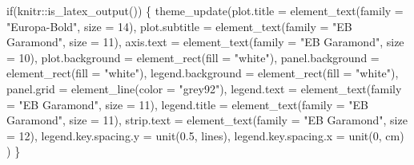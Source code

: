 \documentclass[
  10pt,
  letterpaper,
  DIV=11,
  numbers=noendperiod,
  twoside]{scrartcl}
\newenvironment{Shaded}{\begin{snugshade}}{\end{snugshade}}
\newcommand{\AttributeTok}[1]{\textcolor[rgb]{0.40,0.45,0.13}{#1}}
\newcommand{\ControlFlowTok}[1]{\textcolor[rgb]{0.00,0.23,0.31}{#1}}
\newcommand{\DecValTok}[1]{\textcolor[rgb]{0.68,0.00,0.00}{#1}}
\newcommand{\FloatTok}[1]{\textcolor[rgb]{0.68,0.00,0.00}{#1}}
\newcommand{\FunctionTok}[1]{\textcolor[rgb]{0.28,0.35,0.67}{#1}}
\newcommand{\NormalTok}[1]{\textcolor[rgb]{0.00,0.23,0.31}{#1}}
\newcommand{\SpecialCharTok}[1]{\textcolor[rgb]{0.37,0.37,0.37}{#1}}
\newcommand{\StringTok}[1]{\textcolor[rgb]{0.13,0.47,0.30}{#1}}
\begin{document}
\begin{Shaded}
\begin{Highlighting}[]
\ControlFlowTok{if}\NormalTok{(knitr}\SpecialCharTok{::}\FunctionTok{is\_latex\_output}\NormalTok{()) \{}
\FunctionTok{theme\_update}\NormalTok{(}\AttributeTok{plot.title =} \FunctionTok{element\_text}\NormalTok{(}\AttributeTok{family =} \StringTok{"Europa{-}Bold"}\NormalTok{, }\AttributeTok{size =} \DecValTok{14}\NormalTok{),}
             \AttributeTok{plot.subtitle =} \FunctionTok{element\_text}\NormalTok{(}\AttributeTok{family =} \StringTok{"EB Garamond"}\NormalTok{, }\AttributeTok{size =} \DecValTok{11}\NormalTok{),}
             \AttributeTok{axis.text =} \FunctionTok{element\_text}\NormalTok{(}\AttributeTok{family =} \StringTok{"EB Garamond"}\NormalTok{, }\AttributeTok{size =} \DecValTok{10}\NormalTok{),}
             \AttributeTok{plot.background =} \FunctionTok{element\_rect}\NormalTok{(}\AttributeTok{fill =} \StringTok{"white"}\NormalTok{),}
             \AttributeTok{panel.background =} \FunctionTok{element\_rect}\NormalTok{(}\AttributeTok{fill =} \StringTok{"white"}\NormalTok{),}
             \AttributeTok{legend.background =} \FunctionTok{element\_rect}\NormalTok{(}\AttributeTok{fill =} \StringTok{"white"}\NormalTok{),}
             \AttributeTok{panel.grid =} \FunctionTok{element\_line}\NormalTok{(}\AttributeTok{color =} \StringTok{"grey92"}\NormalTok{),}
             \AttributeTok{legend.text =} \FunctionTok{element\_text}\NormalTok{(}\AttributeTok{family =} \StringTok{"EB Garamond"}\NormalTok{, }\AttributeTok{size =} \DecValTok{11}\NormalTok{),}
            \AttributeTok{legend.title =} \FunctionTok{element\_text}\NormalTok{(}\AttributeTok{family =} \StringTok{"EB Garamond"}\NormalTok{, }\AttributeTok{size =} \DecValTok{11}\NormalTok{),}
             \AttributeTok{strip.text =} \FunctionTok{element\_text}\NormalTok{(}\AttributeTok{family =} \StringTok{"EB Garamond"}\NormalTok{, }\AttributeTok{size =} \DecValTok{12}\NormalTok{),}
             \AttributeTok{legend.key.spacing.y =} \FunctionTok{unit}\NormalTok{(}\FloatTok{0.5}\NormalTok{, }\StringTok{\textquotesingle{}lines\textquotesingle{}}\NormalTok{),}
             \AttributeTok{legend.key.spacing.x =} \FunctionTok{unit}\NormalTok{(}\DecValTok{0}\NormalTok{, }\StringTok{\textquotesingle{}cm\textquotesingle{}}\NormalTok{)}
\NormalTok{  )}
\NormalTok{\}}
\end{Highlighting}
\end{Shaded}
\end{document}
